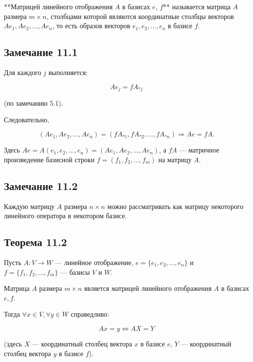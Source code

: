 {**Матрицей линейного отображения \( A \) в базисах \( e \), \( f \)** называется матрица \( A \) размера \( m \times n \), столбцами которой являются координатные столбцы векторов \( A e_1, A e_2, \dots, A e_n \), то есть образов векторов \( e_1, e_2, \dots, e_n \) в базисе \( f \).

\subsection*{Замечание 11.1}

Для каждого \( j \) выполняется:



\[
A e_j = f A_{*j}
\]



(по замечанию 5.1).

Следовательно,



\[
(A e_1, A e_2, \dots, A e_n) = (f A_{*1}, f A_{*2}, \dots, f A_{*n}) \Rightarrow A e = f A.
\]



Здесь \( A e = A (e_1, e_2, \dots, e_n) = (A e_1, A e_2, \dots, A e_n) \), а \( f A \) — матричное произведение базисной строки \( f = (f_1, f_2, \dots, f_m) \) на матрицу \( A \).

\subsection*{Замечание 11.2}

Каждую матрицу \( A \) размера \( n \times n \) можно рассматривать как матрицу некоторого линейного оператора в некотором базисе.

\subsection*{Теорема 11.2}

Пусть \( A : V \to W \) — линейное отображение, \( e = \{e_1, e_2, \dots, e_n\} \) и \( f = \{f_1, f_2, \dots, f_m\} \) — базисы \( V \) и \( W \).

Матрица \( A \) размера \( m \times n \) является матрицей линейного отображения \( A \) в базисах \( e, f \).

Тогда \( \forall x \in V, \forall y \in W \) справедливо:



\[
A x = y \iff A X = Y
\]



(здесь \( X \) — координатный столбец вектора \( x \) в базисе \( e \), \( Y \) — координатный столбец вектора \( y \) в базисе \( f \)).

}
